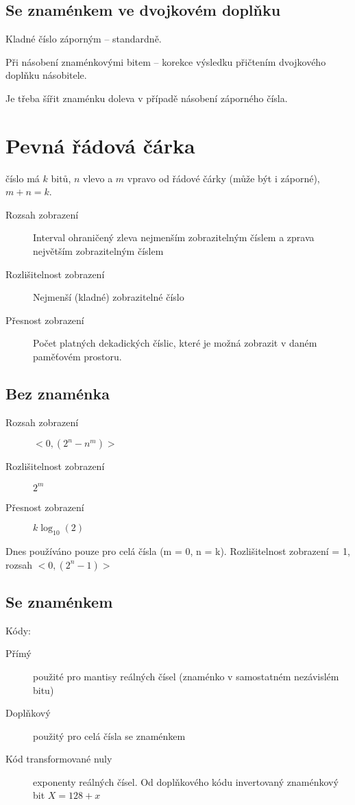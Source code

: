 \documentclass[a4wide]{report}
\begin{document}
\subsection{Se znaménkem ve dvojkovém doplňku}

Kladné číslo záporným -- standardně.

Při násobení znaménkovými bitem -- korekce výsledku přičtením dvojkového doplňku násobitele.

Je třeba šířit znaménku doleva v případě násobení záporného čísla.

\section{Pevná řádová čárka}

číslo má $k$ bitů, $n$ vlevo a $m$ vpravo od řádové čárky (může být i záporné), $m+n = k$.

\begin{description}
	\item[Rozsah zobrazení] Interval ohraničený zleva nejmenším zobrazitelným číslem a zprava největším zobrazitelným číslem
	\item[Rozlišitelnost zobrazení] Nejmenší (kladné) zobrazitelné číslo
	\item[Přesnost zobrazení] Počet platných dekadických číslic, které je možná zobrazit v daném paměťovém prostoru.
\end{description}

\subsection{Bez znaménka}

\begin{description}
	\item[Rozsah zobrazení] $< 0, (2^n - n^m) >$
	\item[Rozlišitelnost zobrazení] $2^m$
	\item[Přesnost zobrazení] $k \log_{10}(2)$
\end{description}

Dnes používáno pouze pro celá čísla (m = 0, n = k). Rozlišitelnost zobrazení = 1, rozsah $<0, (2^n-1)>$

\subsection{Se znaménkem}

Kódy:
\begin{description}
	\item[Přímý] použité pro mantisy reálných čísel (znaménko v samostatném nezávislém bitu)
	\item[Doplňkový] použitý pro celá čísla se znaménkem
	\item[Kód transformované nuly] exponenty reálných čísel. Od doplňkového kódu invertovaný znaménkový bit $X = 128 + x$
\end{description}
\end{document}
